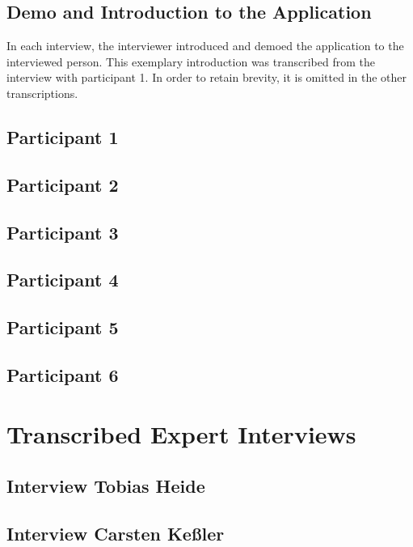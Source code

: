 \documentclass{sigchi}
\begin{document}
\subsection{Demo and Introduction to the Application}

In each interview, the interviewer introduced and demoed the application to the interviewed person. This exemplary introduction was transcribed from the interview with participant 1. In order to retain brevity, it is omitted in the other transcriptions.



\subsection{Participant 1}



\subsection{Participant 2}



\subsection{Participant 3}



\subsection{Participant 4}



\subsection{Participant 5}



\subsection{Participant 6}



\section{Transcribed Expert Interviews}

\subsection{Interview Tobias Heide}



\subsection{Interview Carsten Ke{\ss}ler}


\end{document}

